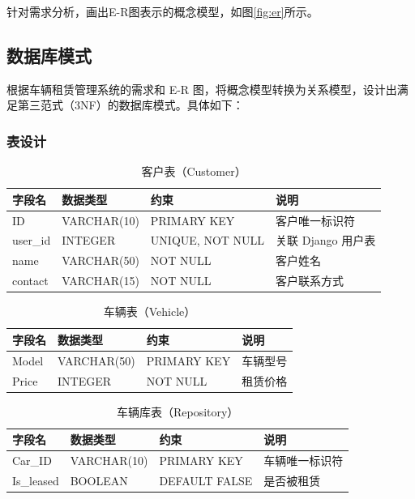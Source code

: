 \documentclass[UTF8,a4paper,12pt]{ctexart}
\begin{document}
针对需求分析，画出E-R图表示的概念模型，如图\ref{fig:er}所示。

\subsection{数据库模式}




根据车辆租赁管理系统的需求和 E-R 图，将概念模型转换为关系模型，设计出满足第三范式（3NF）的数据库模式。具体如下：

\subsubsection{表设计}


\begin{table}[h!]
    \centering
    \caption{客户表（Customer）}
\begin{tabular}{|l|l|l|l|}
\hline
字段名 & 数据类型 & 约束 & 说明 \\
\hline
ID & VARCHAR(10) & PRIMARY KEY & 客户唯一标识符 \\
\hline
user\_id & INTEGER & UNIQUE, NOT NULL & 关联 Django 用户表 \\
\hline
name & VARCHAR(50) & NOT NULL & 客户姓名 \\
\hline
contact & VARCHAR(15) & NOT NULL & 客户联系方式 \\
\hline
\end{tabular}
\end{table}


\begin{table}[h!]
    \centering
    \caption{车辆表（Vehicle）}
\begin{tabular}{|l|l|l|l|}
\hline
字段名 & 数据类型 & 约束 & 说明 \\
\hline
Model & VARCHAR(50) & PRIMARY KEY & 车辆型号 \\
\hline
Price & INTEGER & NOT NULL & 租赁价格 \\
\hline
\end{tabular}
\end{table}


\begin{table}[h!]
    \centering
    \caption{车辆库表（Repository）}
\begin{tabular}{|l|l|l|l|}
\hline
字段名 & 数据类型 & 约束 & 说明 \\
\hline
Car\_ID & VARCHAR(10) & PRIMARY KEY & 车辆唯一标识符 \\
\hline
Is\_leased & BOOLEAN & DEFAULT FALSE & 是否被租赁 \\
\hline
\end{tabular}
\end{table}
\end{document}
